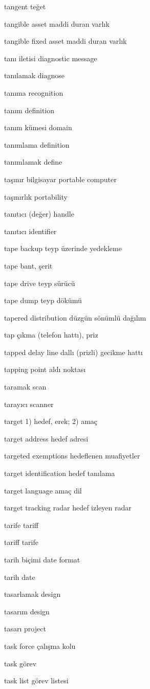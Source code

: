 \documentclass[12pt,fleqn]{article}\usepackage{../../common}
\begin{document}
tangent teğet

tangible asset maddi duran varlık

tangible fixed asset maddi duran varlık

tanı iletisi diagnostic message

tanılamak diagnose

tanıma recognition

tanım definition

tanım kümesi domain

tanımlama definition

tanımlamak define

taşınır bilgisayar portable computer

taşınırlık portability

tanıtıcı (değer) handle

tanıtıcı identifier

tape backup teyp üzerinde yedekleme

tape bant, şerit

tape drive teyp sürücü

tape dump teyp dökümü

tapered distribution düzgün sönümlü dağılım

tap çıkma (telefon hattı), priz

tapped delay line dallı (prizli) gecikme hattı

tapping point aldı noktası

taramak scan

tarayıcı scanner

target 1) hedef, erek; 2) amaç

target address hedef adresi

targeted exemptions hedeflenen muafiyetler

target identification hedef tanılama

target language amaç dil

target tracking radar hedef izleyen radar

tarife tariff

tariff tarife

tarih biçimi date format

tarih date

tasarlamak design

tasarım design

tasarı project

task force çalışma kolu

task görev

task list görev listesi
\end{document}
